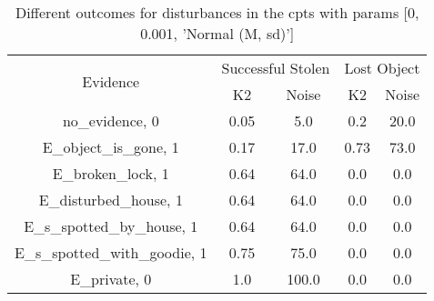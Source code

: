 \begin{table}\begin{tabular}{c|cc|cc}\toprule\multirow{2}{*}{Evidence} & \multicolumn{2}{c}{Successful Stolen} & \multicolumn{2}{c}{Lost Object} \\& {K2} & {Noise} & {K2} & {Noise} \\\midrule
no\_evidence, 0 & 0.05&5.0&0.2&20.0\\E\_object\_is\_gone, 1 & 0.17&17.0&0.73&73.0\\E\_broken\_lock, 1 & 0.64&64.0&0.0&0.0\\E\_disturbed\_house, 1 & 0.64&64.0&0.0&0.0\\E\_s\_spotted\_by\_house, 1 & 0.64&64.0&0.0&0.0\\E\_s\_spotted\_with\_goodie, 1 & 0.75&75.0&0.0&0.0\\E\_private, 0 & 1.0&100.0&0.0&0.0\\\bottomrule\end{tabular}\caption{Different outcomes for disturbances in the cpts with params [0, 0.001, 'Normal (M, sd)']}\end{table}